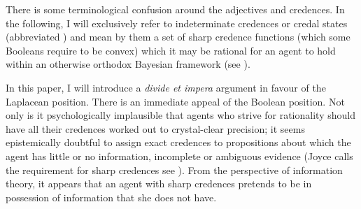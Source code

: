 \documentclass[11pt]{article}
\begin{document}
There is some terminological confusion around the adjectives
  and  credences.
In the following, I will exclusively refer to indeterminate credences
or credal states (abbreviated ) and mean by them a set
of sharp credence functions (which some Booleans require to be convex)
which it may be rational for an agent to hold within an otherwise
orthodox Bayesian framework (see ). 



In this paper, I will introduce a \emph{divide et impera}
argument in favour of the Laplacean position. There is an immediate
appeal of the Boolean position. Not only is it psychologically
implausible that agents who strive for rationality should have all
their credences worked out to crystal-clear precision; it seems
epistemically doubtful to assign exact credences to propositions about
which the agent has little or no information, incomplete or ambiguous
evidence (Joyce calls the requirement for sharp credences
see ). From the perspective of information
theory, it appears that an agent with sharp credences pretends to be
in possession of information that she does not have.
\end{document}
